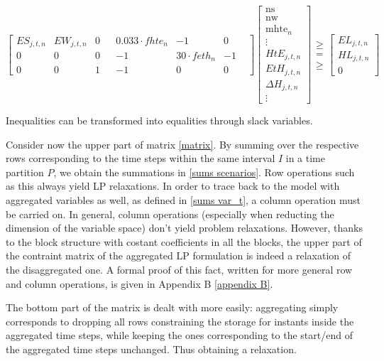 \begin{equation}
\left[
\begin{array}{ccc|ccccc}
    ES_{j,t,n} & EW_{j,t,n} &0& & 0.033\cdot fhte_{n} & -1 & 0 & \\
    0          & 0          &0&  & -1  & 30\cdot feth_n & -1 & \\
    0          & 0          &1 &  & -1   & 0 & 0 &
\end{array}
\right]
  \begin{bmatrix}
    \text{ns}  \\
    \text{nw} \\
    \text{mhte$_n$} \\
    \hline
    \vdots \\
    HtE_{j,t,n} \\
    EtH_{j,t,n} \\
    \Delta H_{j,t,n}\\
    \vdots
  \end{bmatrix}
  \begin{matrix}
  \geq \\
  =\\
  \geq
  \end{matrix}
  \begin{bmatrix}
    EL_{j,t,n} \\
    HL_{j,t,n} \\
    0
  \end{bmatrix}
  \end{equation}  

Inequalities can be transformed into equalities through slack variables.

Consider now the upper part of matrix \ref{matrix}. 
By summing over the respective rows corresponding to the time steps within the same interval $I$ in a time partition $P$, we obtain the summations in \ref{sums scenarios}. 
Row operations such as this always yield LP relaxations. 
In order to trace back to the model with aggregated variables as well, as defined in \ref{sums var_t}, a column operation must be carried on. 
In general, column operations (especially when reducting the dimension of the variable space) don't yield problem relaxations. 
However, thanks to the block structure with costant coefficients in all the blocks, the upper part of the contraint matrix of the aggregated LP formulation is indeed a relaxation of the disaggregated one.  
A formal proof of this fact, written for more general row and column operations, is given in Appendix B \ref{appendix B}.

The bottom part of the matrix is dealt with more easily: aggregating simply corresponds to dropping all rows constraining the storage for instants inside the aggregated time steps, while keeping the ones corresponding to the start/end of the aggregated time steps unchanged.
Thus obtaining a relaxation.





